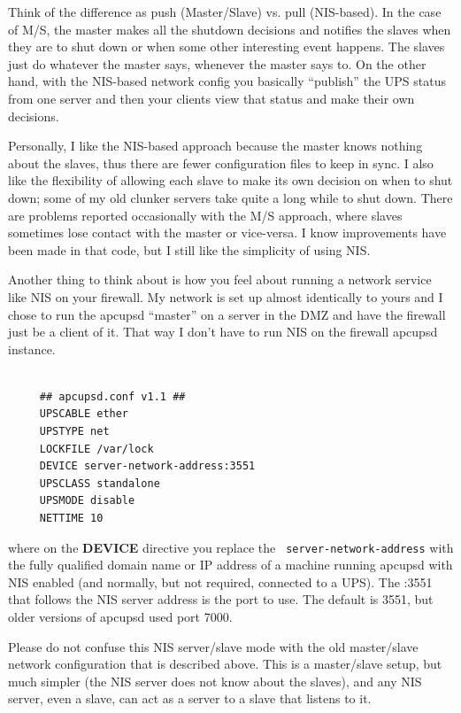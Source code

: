 {Think of the difference as push (Master/Slave) vs. pull (NIS-based). In the
case of M/S, the master makes all the shutdown decisions and notifies the
slaves when they are to shut down or when some other interesting event
happens. The slaves just do whatever the master says, whenever the master says
to. On the other hand, with the NIS-based network config you basically
``publish'' the UPS status from one server and then your clients view that
status and make their own decisions.  

Personally, I like the NIS-based approach because the master knows nothing
about the slaves, thus there are fewer configuration files to keep in sync. I
also like the flexibility of allowing each slave to make its own decision on
when to shut down; some of my old clunker servers take quite a long while to
shut down. There are problems reported occasionally with the M/S approach,
where slaves sometimes lose contact with the master or vice-versa. I know
improvements have been made in that code, but I still like the simplicity of
using NIS.  

Another thing to think about is how you feel about running a network service
like NIS on your firewall. My network is set up almost identically to yours
and I chose to run the apcupsd ``master'' on a server in the DMZ and have the
firewall just be a client of it. That way I don't have to run NIS on the
firewall apcupsd instance. 

\footnotesize
\begin{verbatim}
     
     ## apcupsd.conf v1.1 ##
     UPSCABLE ether
     UPSTYPE net
     LOCKFILE /var/lock
     DEVICE server-network-address:3551
     UPSCLASS standalone
     UPSMODE disable
     NETTIME 10
\end{verbatim}
\normalsize

where on the {\bf DEVICE} directive you replace the {\tt
server-network-address} with the fully qualified domain name or IP address of
a machine running apcupsd with NIS enabled (and normally, but not required,
connected to a UPS). The :3551 that follows the NIS server address is the port
to use. The default is 3551, but older versions of apcupsd used port 7000.  

Please do not confuse this NIS server/slave mode with the old master/slave
network configuration that is described above.  This is a master/slave setup,
but much simpler (the NIS server does not know about the slaves), and any NIS
server, even a slave, can act as a server to a slave that listens to it.  

}
